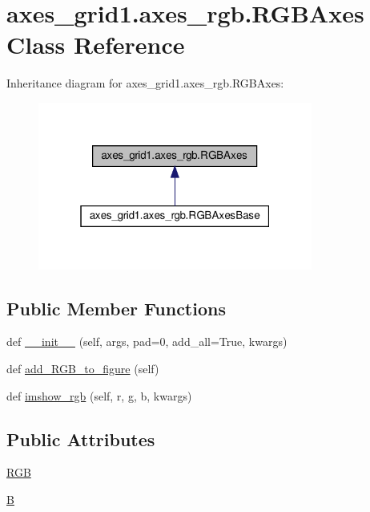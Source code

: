 \hypertarget{classaxes__grid1_1_1axes__rgb_1_1RGBAxes}{}\section{axes\+\_\+grid1.\+axes\+\_\+rgb.\+R\+G\+B\+Axes Class Reference}
\label{classaxes__grid1_1_1axes__rgb_1_1RGBAxes}


Inheritance diagram for axes\+\_\+grid1.\+axes\+\_\+rgb.\+R\+G\+B\+Axes\+:
\nopagebreak
\begin{figure}[H]
\begin{center}
\leavevmode
\includegraphics[width=256pt]{classaxes__grid1_1_1axes__rgb_1_1RGBAxes__inherit__graph}
\end{center}
\end{figure}
\subsection*{Public Member Functions}
\begin{DoxyCompactItemize}
\item 
def \hyperlink{classaxes__grid1_1_1axes__rgb_1_1RGBAxes_a430b4350a6db1197c3210f4249cbc906}{\+\_\+\+\_\+init\+\_\+\+\_\+} (self, args, pad=0, add\+\_\+all=True, kwargs)
\item 
def \hyperlink{classaxes__grid1_1_1axes__rgb_1_1RGBAxes_abe7cb6462c1e1bedabed3442cd61448e}{add\+\_\+\+R\+G\+B\+\_\+to\+\_\+figure} (self)
\item 
def \hyperlink{classaxes__grid1_1_1axes__rgb_1_1RGBAxes_acec2df179d3849087b8284be3bacbb0d}{imshow\+\_\+rgb} (self, r, g, b, kwargs)
\end{DoxyCompactItemize}
\subsection*{Public Attributes}
\begin{DoxyCompactItemize}
\item 
\hyperlink{classaxes__grid1_1_1axes__rgb_1_1RGBAxes_a97c4e5c3c44c5e856747acd9222faa9a}{R\+GB}
\item 
\hyperlink{classaxes__grid1_1_1axes__rgb_1_1RGBAxes_ac55a6c9b2fabc36b474456ca15a8ff51}{B}
\end{DoxyCompactItemize}


